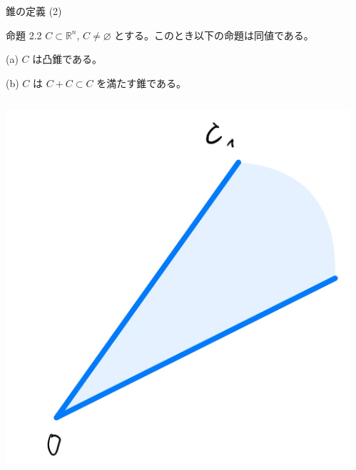 \documentclass[aspectratio=169, dvipdfmx, 11pt]{beamer} %
\begin{document}
\begin{frame}{錐の定義 (2) }
  \begin{block}{命題 2.2}
    $C \subset \mathbb{R}^n$, $C \neq \varnothing$ とする。このとき以下の命題は同値である。

    (a) $C$ は凸錐である。

    (b) $C$ は $C + C \subset C$ を満たす錐である。

  \end{block}

  \centering
  \begin{columns}
    \begin{column}{0.48\textwidth}
      \includegraphics[keepaspectratio, scale=0.08]{figures/cone_figure_1.jpg}
    \end{column}
    \begin{column}{0.48\textwidth}

\end{column}
\end{columns}
\end{frame}
\end{document}
